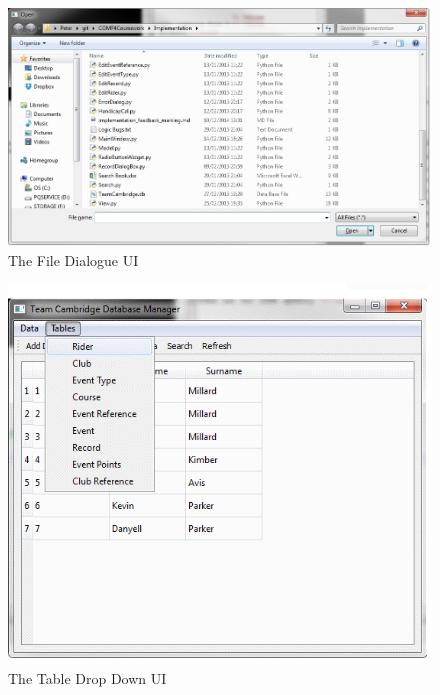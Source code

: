 \begin{figure}[H]
\includegraphics[width=\textwidth]{./Maintenance/UI/FileDia.png}
\caption{The File Dialogue UI} \label{fig:FileDia_UI}
\end{figure}

\begin{figure}[H]
\includegraphics{./Maintenance/UI/TableDrop.png}
\caption{The Table Drop Down UI} \label{fig:TableDrop_UI}
\end{figure}


\clearpage
